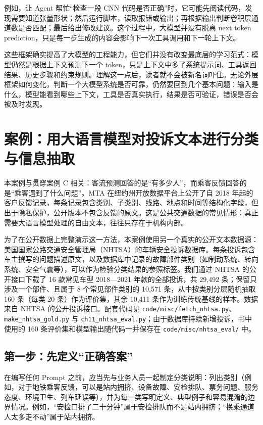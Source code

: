 例如，让 Agent 帮忙“检查一段 CNN 代码是否正确”时，它可能先阅读代码，发现需要知道张量形状；然后运行脚本，读取报错或输出；再根据输出判断卷积层通道数是否匹配；最后给出修改建议。这个过程中，大模型并没有脱离 next token prediction，只是每一步生成的内容会影响下一次工具调用和下一轮上下文。

这些框架确实提高了大模型的工程能力，但它们并没有改变最底层的学习范式：模型仍然是根据上下文预测下一个 token，只是上下文中多了系统提示词、工具返回结果、历史步骤和约束规则。理解这一点后，读者就不会被新名词吓住。无论外层框架如何变化，判断一个大模型系统是否可靠，仍然要回到几个基本问题：输入是什么，模型能看到哪些上下文，工具是否真实执行，结果是否可验证，错误是否会被及时发现。

\section{案例：用大语言模型对投诉文本进行分类与信息抽取}
\label{sec:ch11_case}

本案例与贯穿案例 C 相关：客流预测回答的是“有多少人”，而乘客反馈回答的是“乘客遇到了什么问题”。MTA 在纽约州开放数据平台上公开了自 2018 年起的客户反馈记录，每条记录包含类别、子类别、线路、地点和时间等结构化字段，但出于隐私保护，公开版本不包含反馈的原文。这是公共交通数据的常见情形：真正需要大语言模型处理的自由文本，往往只存在于机构内部。

为了在公开数据上完整演示这一方法，本案例使用另一个真实的公开文本数据源：美国国家公路交通安全管理局（NHTSA）的车辆安全投诉数据库。每条投诉包含车主撰写的问题描述原文，以及数据库中记录的故障部件类别（如制动系统、转向系统、安全气囊等），可以作为检验分类结果的参照标签。我们通过 NHTSA 的公开接口下载了 16 款常见车型 2018—2021 年款的全部投诉，共 29,492 条；保留只涉及一个部件、且属于 8 个常见部件类别的 10,571 条，从中按类别分层随机抽取 160 条（每类 20 条）作为评价集，其余 10,411 条作为训练传统基线的样本。数据来自 NHTSA 的公开投诉接口\cite{nhtsa2026complaints}。配套代码见 \texttt{code/misc/fetch\_nhtsa.py}、\texttt{make\_nhtsa\_gold.py} 与 \texttt{ch11\_nhtsa\_eval.py}；由于数据库持续新增投诉，书中使用的 160 条评价集和模型输出随代码一并保存在 \texttt{code/misc/nhtsa\_eval/} 中。

\subsection{第一步：先定义“正确答案”}

在编写任何 Prompt 之前，应当先与业务人员一起制定分类说明：列出类别（例如，对于地铁乘客反馈，可以是站内拥挤、设备故障、安检排队、票务问题、服务态度、环境卫生、列车延误等），并为每一类写明定义、典型例子和容易混淆的边界情况。例如，“安检口排了二十分钟”属于安检排队而不是站内拥挤；“换乘通道人太多走不动”属于站内拥挤。

